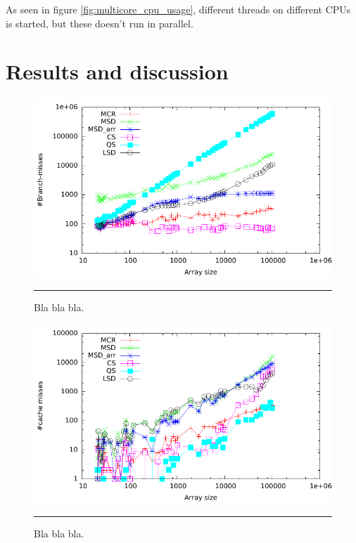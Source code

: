As seen in figure \ref{fig:multicore_cpu_usage}, different threads on different CPUs is started, but these doesn't run in parallel.

\section{Results and discussion}


\begin{figure}[htbp]
	\centering
		\includegraphics[width=\textwidth]{./Figures/Project2b/Branch_misses.pdf}
		\rule{35em}{0.5pt}
	\caption[Branch misses]{
	Bla bla bla.
	}
	\label{fig:Branch_misses_p2b}
\end{figure}


\begin{figure}[htbp]
	\centering
		\includegraphics[width=\textwidth]{./Figures/Project2b/Cache_misses.pdf}
		\rule{35em}{0.5pt}
	\caption[Cache misses]{
	Bla bla bla.
	}
	\label{fig:Cache_misses_p2b}
\end{figure}



